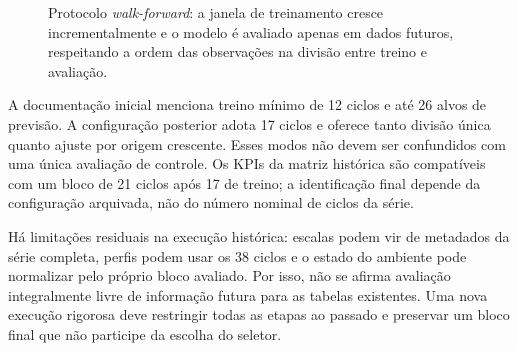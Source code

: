 \begin{figure}[htbp]
\centering
{}
\caption{Protocolo \textit{walk-forward}: a janela de treinamento cresce incrementalmente e o modelo é avaliado apenas em dados futuros, respeitando a ordem das observações na divisão entre treino e avaliação.}
\label{fig:walkforward}
\end{figure}

A documentação inicial menciona treino mínimo de 12 ciclos e até 26 alvos de previsão. A configuração posterior adota 17 ciclos e oferece tanto divisão única quanto ajuste por origem crescente. Esses modos não devem ser confundidos com uma única avaliação de controle. Os KPIs da matriz histórica são compatíveis com um bloco de 21 ciclos após 17 de treino; a identificação final depende da configuração arquivada, não do número nominal de ciclos da série.

Há limitações residuais na execução histórica: escalas podem vir de metadados da série completa, perfis podem usar os 38 ciclos e o estado do ambiente pode normalizar pelo próprio bloco avaliado. Por isso, não se afirma avaliação integralmente livre de informação futura para as tabelas existentes. Uma nova execução rigorosa deve restringir todas as etapas ao passado e preservar um bloco final que não participe da escolha do seletor.

